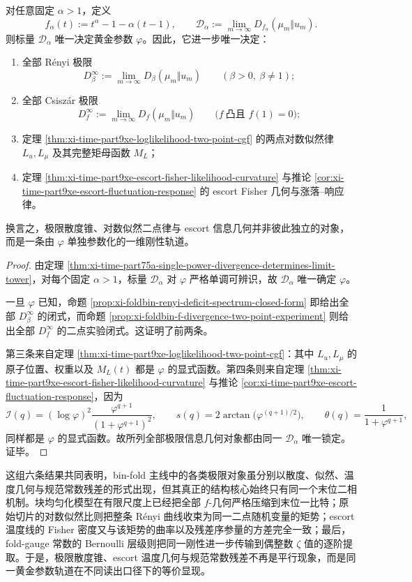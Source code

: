 \begin{theorem}[单一幂散度标量对极限信息几何的统一重构]\label{thm:xi-time-part9xe-single-power-divergence-unifies-limit-geometry}
对任意固定 \(\alpha>1\)，定义
\[
f_\alpha(t):=t^\alpha-1-\alpha(t-1),
\qquad
\mathcal D_\alpha:=\lim_{m\to\infty}D_{f_\alpha}(\mu_m\Vert u_m).
\]
则标量 \(\mathcal D_\alpha\) 唯一决定黄金参数 \(\varphi\)。因此，它进一步唯一决定：
\begin{enumerate}
  \item 全部 Rényi 极限
  \[
  D_\beta^\infty:=\lim_{m\to\infty}D_\beta(\mu_m\Vert u_m)
  \qquad (\beta>0,\ \beta\neq 1);
  \]
  \item 全部 Csisz\'ar 极限
  \[
  D_f^\infty:=\lim_{m\to\infty}D_f(\mu_m\Vert u_m)
  \qquad
  \bigl(f\ \text{凸且 }f(1)=0\bigr);
  \]
  \item 定理 \ref{thm:xi-time-part9xe-loglikelihood-two-point-cgf} 的两点对数似然律 \(L_u,L_\mu\) 及其完整矩母函数 \(M_L\)；
  \item 定理 \ref{thm:xi-time-part9xe-escort-fisher-likelihood-curvature} 与推论 \ref{cor:xi-time-part9xe-escort-fluctuation-response} 的 escort Fisher 几何与涨落--响应律。
\end{enumerate}
换言之，极限散度锥、对数似然二点律与 escort 信息几何并非彼此独立的对象，而是一条由 \(\varphi\) 单独参数化的一维刚性轨道。
\end{theorem}
\begin{proof}
由定理 \ref{thm:xi-time-part75a-single-power-divergence-determines-limit-tower}，对每个固定 \(\alpha>1\)，标量 \(\mathcal D_\alpha\) 对 \(\varphi\) 严格单调可辨识，故 \(\mathcal D_\alpha\) 唯一确定 \(\varphi\)。

一旦 \(\varphi\) 已知，命题 \ref{prop:xi-foldbin-renyi-deficit-spectrum-closed-form} 即给出全部 \(D_\beta^\infty\) 的闭式，而命题 \ref{prop:xi-foldbin-f-divergence-two-point-experiment} 则给出全部 \(D_f^\infty\) 的二点实验闭式。这证明了前两条。

第三条来自定理 \ref{thm:xi-time-part9xe-loglikelihood-two-point-cgf}：其中 \(L_u,L_\mu\) 的原子位置、权重以及 \(M_L(t)\) 都是 \(\varphi\) 的显式函数。第四条则来自定理 \ref{thm:xi-time-part9xe-escort-fisher-likelihood-curvature} 与推论 \ref{cor:xi-time-part9xe-escort-fluctuation-response}，因为
\[
\mathcal I(q)
=
(\log\varphi)^2\frac{\varphi^{q+1}}{(1+\varphi^{q+1})^2},
\qquad
s(q)=2\arctan\!\bigl(\varphi^{(q+1)/2}\bigr),
\qquad
\theta(q)=\frac{1}{1+\varphi^{q+1}},
\]
同样都是 \(\varphi\) 的显式函数。故所列全部极限信息几何对象都由同一 \(\mathcal D_\alpha\) 唯一锁定。证毕。
\end{proof}

\noindent
这组六条结果共同表明，bin-fold 主线中的各类极限对象虽分别以散度、似然、温度几何与规范常数残差的形式出现，但其真正的结构核心始终只有同一个末位二相机制。块均匀化模型在有限尺度上已经把全部 \(f\)-几何严格压缩到末位一比特；原始切片的对数似然比则把整条 Rényi 曲线收束为同一二点随机变量的矩势；escort 温度线的 Fisher 密度又与该矩势的曲率以及残差序参量的方差完全一致；最后，fold-gauge 常数的 Bernoulli 层级则把同一刚性进一步传输到偶整数 \(\zeta\) 值的逐阶提取。于是，极限散度锥、escort 温度几何与规范常数残差不再是平行现象，而是同一黄金参数轨道在不同读出口径下的等价显现。

\endinput
